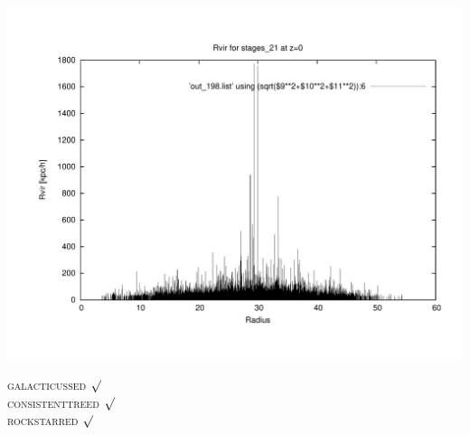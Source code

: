 \includegraphics[scale=0.3]{stages_21/plot_rvir_z0.pdf}

\textsc{galacticussed} $\surd$ \\
\textsc{consistenttreed} $\surd$ \\ 
\textsc{rockstarred} $\surd$

